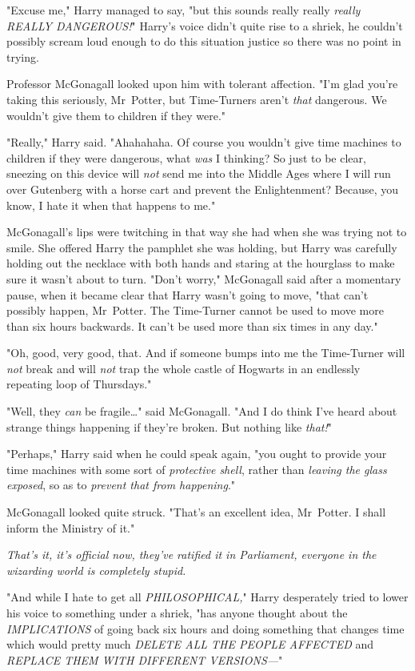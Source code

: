 "Excuse me," Harry managed to say, "but this sounds really really \emph{really
REALLY DANGEROUS!}" Harry's voice didn't quite rise to a shriek, he couldn't
possibly scream loud enough to do this situation justice so there was no point
in trying.

Professor McGonagall looked upon him with tolerant affection. "I'm glad you're
taking this seriously, Mr~Potter, but Time-Turners aren't \emph{that}
dangerous. We wouldn't give them to children if they were."

"Really," Harry said. "Ahahahaha. Of course you wouldn't give time machines to
children if they were dangerous, what \emph{was} I thinking? So just to be
clear, sneezing on this device will \emph{not} send me into the Middle Ages
where I will run over Gutenberg with a horse cart and prevent the
Enlightenment? Because, you know, I hate it when that happens to me."

McGonagall's lips were twitching in that way she had when she was trying not to
smile. She offered Harry the pamphlet she was holding, but Harry was carefully
holding out the necklace with both hands and staring at the hourglass to make
sure it wasn't about to turn. "Don't worry," McGonagall said after a momentary
pause, when it became clear that Harry wasn't going to move, "that can't
possibly happen, Mr~Potter. The Time-Turner cannot be used to move more than
six hours backwards. It can't be used more than six times in any day."

"Oh, good, very good, that. And if someone bumps into me the Time-Turner will
\emph{not} break and will \emph{not} trap the whole castle of Hogwarts in an
endlessly repeating loop of Thursdays."

"Well, they \emph{can} be fragile…" said McGonagall. "And I do think
I've heard about strange things happening if they're broken. But nothing like
\emph{that!}"

"Perhaps," Harry said when he could speak again, "you ought to provide your
time machines with some sort of \emph{protective shell}, rather than
\emph{leaving the glass exposed}, so as to \emph{prevent that from happening}."

McGonagall looked quite struck. "That's an excellent idea, Mr~Potter. I shall
inform the Ministry of it."

\emph{That's it, it's official now, they've ratified it in Parliament, everyone
in the wizarding world is completely stupid.}

"And while I hate to get all \emph{PHILOSOPHICAL,}" Harry desperately tried to
lower his voice to something under a shriek, "has anyone thought about the
\emph{IMPLICATIONS} of going back six hours and doing something that changes
time which would pretty much \emph{DELETE ALL THE PEOPLE AFFECTED} and
\emph{REPLACE THEM WITH DIFFERENT VERSIONS—}"

